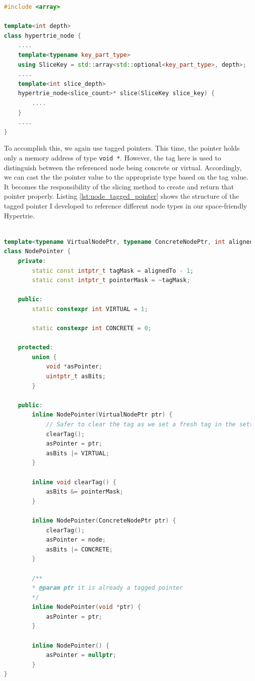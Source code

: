 \begin{lstlisting}[caption={Slicing method signituar defined for node where d = $depth$ in original Hypertrie},label={lst:slicing_original_hypertrie},language=C++]
#include <array>

template<int depth>
class hypertrie_node {
	....
	template<typename key_part_type>
	using SliceKey = std::array<std::optional<key_part_type>, depth>;
	....
	template<int slice_depth>
	hypertrie_node<slice_count>* slice(SliceKey slice_key) {
		....
	}
	....
}
\end{lstlisting} 

To accomplish this, we again use tagged pointers. This time, the pointer holds only a memory address of type \texttt{void *}. However, the tag here is used to distinguish between the referenced node being concrete or virtual. Accordingly, we can cast the the pointer value to the appropriate type based on the tag value. 
It becomes the responsibility of the slicing method to create and return that pointer properly. Listing \ref{lst:node_tagged_pointer} shows the structure of the tagged pointer I developed to reference different node types in our space-friendly Hypertrie. 

\begin{lstlisting}[caption={Node pointer structure},label={lst:node_tagged_pointer},language=C++]

template<typename VirtualNodePtr, typename ConcreteNodePtr, int alignedTo>
class NodePointer {
	private:
	  	static const intptr_t tagMask = alignedTo - 1;
	    static const intptr_t pointerMask = ~tagMask;
	  
	public:
		static constexpr int VIRTUAL = 1;
		
		static constexpr int CONCRETE = 0;
	
	protected:
		union {
		  	void *asPointer;
		  	uintptr_t asBits;
		}
      
	public:
        inline NodePointer(VirtualNodePtr ptr) {
	        // Safer to clear the tag as we set a fresh tag in the setter method
	        clearTag();
	        asPointer = ptr;
	        asBits |= VIRTUAL;
        }
        
        inline void clearTag() {
       		asBits &= pointerMask;
        }
        
		inline NodePointer(ConcreteNodePtr ptr) {
        	clearTag();
           	asPointer = node;
           	asBits |= CONCRETE;
        }
        
        /**
        * @param ptr it is already a tagged pointer
        */
        inline NodePointer(void *ptr) {
	       	asPointer = ptr;
        }
        
        inline NodePointer() {
        	asPointer = nullptr;
        }
}
\end{lstlisting} 


